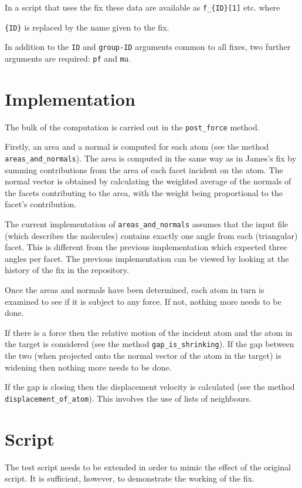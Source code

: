 \documentclass[11pt,a4paper]{article}
\begin{document}
In a script that uses the fix these data are available  as \verb|f_{ID}[1]| etc. where {\verb|{ID}| is replaced by the  name given to the fix.

In addition to the \verb|ID| and \verb|group-ID| arguments common to all fixes, two further arguments are required: \verb|pf| and \verb|mu|.

\section*{Implementation}

The bulk of the computation is carried out in the \verb|post_force| method.

Firstly, an area and a normal is computed for each atom (see the method \verb|areas_and_normals|). The area is computed in the same way as in James's fix by summing contributions from the area of each facet incident on the atom. The normal vector  is obtained by calculating the weighted average of the normals of the facets contributing to the area, with the weight being proportional to the facet's contribution.

The current implementation of  \verb|areas_and_normals| assumes that the input file (which describes the molecules) contains exactly one angle from each (triangular) facet. This is different from the previous implementation which expected three angles per facet. The previous implementation can be viewed by looking at the history of the fix in the repository.

Once the areas and normals have been determined, each atom in turn is examined to see if it is subject to any force. If not, nothing more needs to be done.

If there is a force then the relative motion of the incident atom and the atom in the target is considered (see the method \verb|gap_is_shrinking|). If the gap between the two (when projected onto the normal vector of the atom in the target) is widening then nothing more needs to be done.

If the gap is closing then the displacement velocity is calculated (see the method \verb|displacement_of_atom|). This involves the use of lists of neighbours.

\section*{Script}

The test script needs to be extended in order to mimic the effect of the original script. It is sufficient, however, to demonstrate the working of the fix.

}
\end{document}
